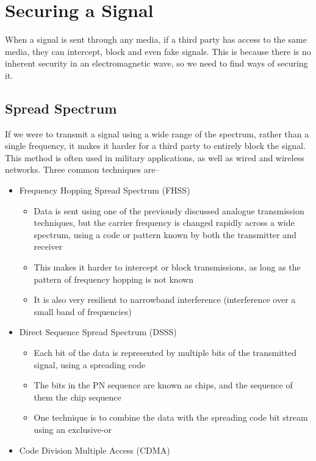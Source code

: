 \section*{Securing a Signal}

When a signal is sent through any media, if a third party has access to the same media, they can intercept, block and
 even fake signals. This is because there is no inherent security in an electromagnetic wave, so we need to find ways of
 securing it.

\subsection*{Spread Spectrum}

If we were to transmit a signal using a wide range of the spectrum, rather than a single frequency, it makes it harder
 for a third party to entirely block the signal. This method is often used in military applications, as well as wired and
 wireless networks. Three common techniques are--

\begin{itemize}
  \item Frequency Hopping Spread Spectrum (FHSS)
  \begin{itemize}
    \item Data is sent using one of the previously discussed analogue transmission techniques, but the carrier frequency
     is changed rapidly across a wide spectrum, using a code or pattern known by both the transmitter and receiver
    \item This makes it harder to intercept or block transmissions, as long as the pattern of frequency hopping is not
     known
    \item It is also very resilient to narrowband interference (interference over a small band of frequencies)
  \end{itemize}
  \item Direct Sequence Spread Spectrum (DSSS)
  \begin{itemize}
    \item Each bit of the data is represented by multiple bits of the transmitted signal, using a spreading
     code
    \item The bits in the PN sequence are known as chips, and the sequence of them the chip sequence
    \item One technique is to combine the data with the spreading code bit stream using an exclusive-or
  \end{itemize}
  \item Code Division Multiple Access (CDMA)
\end{itemize}

